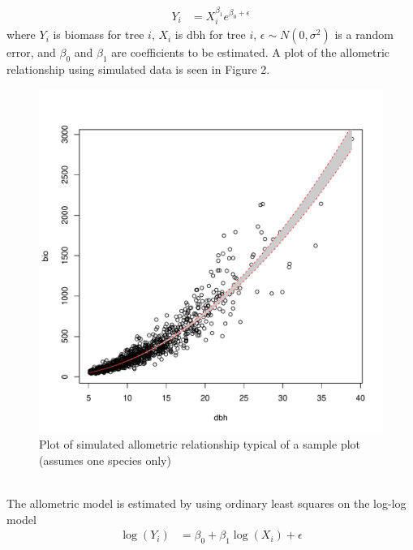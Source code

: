 \documentclass[fleqn]{article}
\begin{document}
  \begin{align}
  \label{1}
     Y_i & =  X_i^{\beta_1} e^{\beta_0 + \epsilon}
  \end{align}
  where $Y_i$ is biomass for tree $i$, $X_i$ is dbh for tree $i$, $\epsilon \sim N(0, \sigma^2)$ is a random error, and $\beta_0$ and $\beta_1$ are coefficients to be estimated. A plot of the allometric relationship using simulated data is seen in Figure 2.\\
  \begin{figure}
    \centering
    \caption{Plot of simulated allometric relationship typical of a sample plot (assumes one species only)}
    \includegraphics[scale = 0.5]{dbhModel}
  \end{figure}
\\
The allometric model is estimated by using ordinary least squares on the log-log model\\
  \begin{align}
  \label{2}
    \log(Y_i) & = \beta_0 + \beta_1 \log(X_i) + \epsilon
  \end{align}
\end{document}
